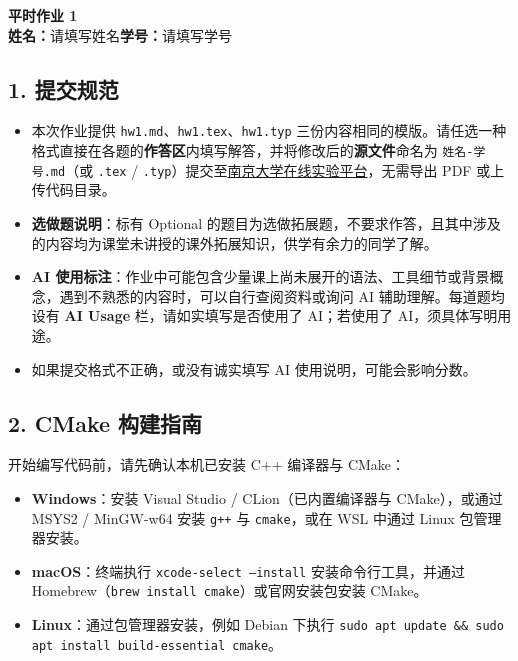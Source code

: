 \documentclass[11pt,a4paper]{ctexart}
\newcommand{\StudentName}{请填写姓名}
\newcommand{\StudentID}{请填写学号}
\begin{document}
\begin{center}
  {\LARGE\bfseries 平时作业 1}\\[0.6em]
  {\normalsize \textbf{姓名：}\StudentName \qquad \textbf{学号：}\StudentID}
\end{center}
\vspace{0.4em}

\subsection*{1. 提交规范}
\begin{itemize}
  \item 本次作业提供 \texttt{hw1.md}、\texttt{hw1.tex}、\texttt{hw1.typ} 三份内容相同的模版。请任选一种格式直接在各题的\textbf{作答区}内填写解答，并将修改后的\textbf{源文件}命名为 \texttt{姓名-学号.md}（或 \texttt{.tex} / \texttt{.typ}）提交至\href{https://cslab-cms.nju.edu.cn/}{南京大学在线实验平台}，无需导出 PDF 或上传代码目录。
  \item \textbf{选做题说明}：标有 Optional 的题目为选做拓展题，不要求作答，且其中涉及的内容均为课堂未讲授的课外拓展知识，供学有余力的同学了解。
  \item \textbf{AI 使用标注}：作业中可能包含少量课上尚未展开的语法、工具细节或背景概念，遇到不熟悉的内容时，可以自行查阅资料或询问 AI 辅助理解。每道题均设有 \textbf{AI Usage} 栏，请如实填写是否使用了 AI；若使用了 AI，须具体写明用途。
  \item 如果提交格式不正确，或没有诚实填写 AI 使用说明，可能会影响分数。
\end{itemize}

\subsection*{2. CMake 构建指南}
开始编写代码前，请先确认本机已安装 C++ 编译器与 CMake：
\begin{itemize}
  \item \textbf{Windows}：安装 Visual Studio / CLion（已内置编译器与 CMake），或通过 MSYS2 / MinGW-w64 安装 \texttt{g++} 与 \texttt{cmake}，或在 WSL 中通过 Linux 包管理器安装。
  \item \textbf{macOS}：终端执行 \texttt{xcode-select --install} 安装命令行工具，并通过 Homebrew（\texttt{brew install cmake}）或官网安装包安装 CMake。
  \item \textbf{Linux}：通过包管理器安装，例如 Debian 下执行 \texttt{sudo apt update \&\& sudo apt install build-essential cmake}。
\end{itemize}
\end{document}
